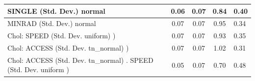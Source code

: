 \begin{table}
\begin{center}
\begin{tabular}{|l|l|c|c|c|l|}
			\hline
			SINGLE (Std. Dev.) normal &  & 0.06 & 0.07 & 0.84 & 0.40 \\
			\hline
			MINRAD (Std. Dev.) normal &  & 0.07 & 0.07 & 0.95 & 0.34 \\
			\hline
			 Chol: SPEED (Std. Dev. uniform) ) &  & 0.07 & 0.07 & 0.93 & 0.35 \\
			\hline
			 Chol: ACCESS (Std. Dev. tn_normal) ) &  & 0.07 & 0.07 & 1.02 & 0.31 \\
			\hline
			 Chol: ACCESS (Std. Dev. tn_normal) . SPEED (Std. Dev.   uniform ) &  & 0.05 & 0.07 & 0.70 & 0.48 \\
			\hline
		\end{tabular}
	\end{center}
\end{table}